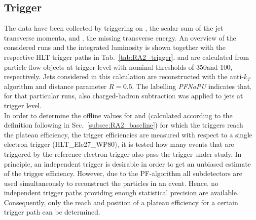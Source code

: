 \subsection{Trigger}
\label{subsec:RA2_trigger}
\begin{table}[!t]
\centering
\caption{Signal trigger paths used in different run ranges listed together with the integrated luminosity.}
\label{tab:RA2_trigger}
\end{table}  
The data have been collected by triggering on \HT, the scalar sum of the jet transverse momenta, and \met, the missing transverse energy. An overview of the considered runs and the integrated luminosity is shown together with the respective HLT trigger paths in Tab.~\ref{tab:RA2_trigger}. \HT and \met are calculated from particle-flow objects at trigger level with nominal thresholds of 350\gev and 100\gev, respectively. Jets considered in this calculation are reconstructed with the anti-$k_T$ algorithm and distance parameter $R = 0.5$. The labelling \textit{PFNoPU} indicates that, for that particular runs, also charged-hadron subtraction was applied to jets at trigger level. \\
In order to determine the offline values for \HT and \MHT (calculated according to the definition following in Sec.~\ref{subsec:RA2_baseline}) for which the triggers reach the plateau efficiency, the trigger efficiencies are measured with respect to a single electron trigger (HLT\_Ele27\_WP80), \ie it is tested how many events that are triggered by the reference electron trigger also pass the trigger under study. In principle, an independent trigger is desirable in order to get an unbiased estimate of the trigger efficiency. However, due to the PF-algorithm all subdetectors are used simultaneously to reconstruct the particles in an event. Hence, no independent trigger paths providing enough statistical precision are available. Consequently, only the reach and position of a plateau efficiency for a certain trigger path can be determined. \\
